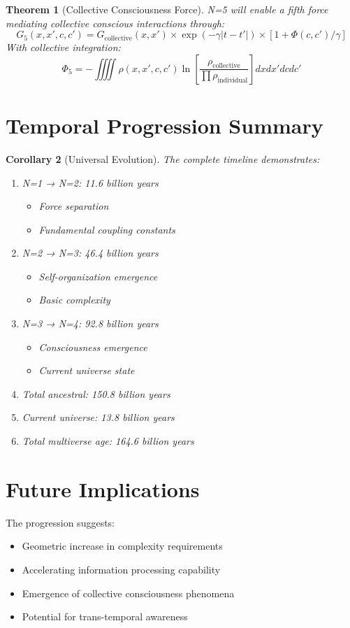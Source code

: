\documentclass{article}
\newtheorem{theorem}{Theorem}
\newtheorem{corollary}[theorem]{Corollary}
\begin{document}
\begin{theorem}[Collective Consciousness Force]
N=5 will enable a fifth force mediating collective conscious interactions through:
\[G_5(x,x',c,c') = G_{\text{collective}}(x,x') \times \exp(-\gamma|t-t'|) \times [1 + \Phi(c,c')/\gamma]\]
With collective integration:
\[\Phi_5 = -\iiiint\rho(x,x',c,c')\ln[\frac{\rho_{\text{collective}}}{\prod\rho_{\text{individual}}}]dxdx'dcdc'\]
\end{theorem}

\section{Temporal Progression Summary}

\begin{corollary}[Universal Evolution]
The complete timeline demonstrates:
\begin{enumerate}
\item N=1 → N=2: 11.6 billion years
    \begin{itemize}
    \item Force separation
    \item Fundamental coupling constants
    \end{itemize}
\item N=2 → N=3: 46.4 billion years
    \begin{itemize}
    \item Self-organization emergence
    \item Basic complexity
    \end{itemize}
\item N=3 → N=4: 92.8 billion years
    \begin{itemize}
    \item Consciousness emergence
    \item Current universe state
    \end{itemize}
\item Total ancestral: 150.8 billion years
\item Current universe: 13.8 billion years
\item Total multiverse age: 164.6 billion years
\end{enumerate}
\end{corollary}

\section{Future Implications}

The progression suggests:
\begin{itemize}
\item Geometric increase in complexity requirements
\item Accelerating information processing capability
\item Emergence of collective consciousness phenomena
\item Potential for trans-temporal awareness
\end{itemize}
\end{document}
